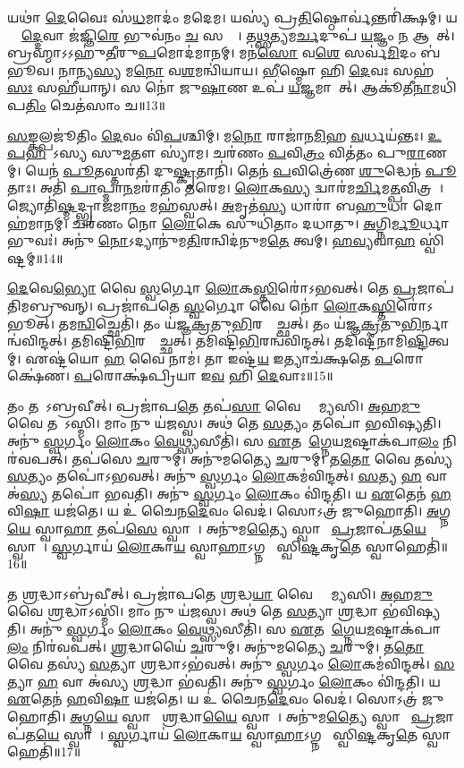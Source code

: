    𑌯𑌥𑌾॑ \ul{𑌦𑍇}𑌵𑍈𑌃 𑌸॑\ul{𑌧}𑌮𑌾𑌦𑌂॑ 𑌮𑌦𑍇𑌮।
   𑌯𑌸𑍍𑌯॑ 𑌪𑍍𑌰\ul{𑌤𑌿}𑌷𑍍𑌠𑍋𑌰𑍍𑌵॑𑌨𑍍𑌤𑌰𑌿॑𑌕𑍍𑌷𑌮𑍍।
   𑌯𑌸𑍍𑌮𑌾᳚\ul{𑌦𑍍𑌦𑍇}𑌵𑌾 𑌜॑𑌜𑍍𑌞𑌿\ul{𑌰𑍇} 𑌭𑍁𑌵॑𑌨𑌂 \ul{𑌚} 𑌸𑌰𑍍𑌵𑍇᳚।
   𑌤\ul{𑌥𑍍𑌸}𑌤𑍍𑌯𑌮\ul{𑌰𑍍𑌚}𑌦𑍁𑌪॑ \ul{𑌯}𑌜𑍍𑌞𑌂 \ul{𑌨} 𑌆𑌗𑌾᳚𑌤𑍍।
   𑌬𑍍𑌰𑌹𑍍𑌮𑌾𑌽𑌽𑌹𑍁॑\ul{𑌤𑍀}𑌰𑍁\ul{𑌪}𑌮𑍋𑌦॑𑌮𑌾𑌨𑌮𑍍।
   𑌮𑌨॑\ul{𑌸𑍋} 𑌵\ul{𑌶𑍇} 𑌸𑌰𑍍𑌵॑\ul{𑌮𑌿}𑌦𑌂 𑌬॑𑌭𑍂𑌵।
   𑌨𑌾𑌨𑍍𑌯\ul{𑌸𑍍𑌯} 𑌮\ul{𑌨𑍋} 𑌵\ul{𑌶}𑌮𑌨𑍍𑌵𑌿॑𑌯𑌾𑌯।
   \ul{𑌭𑍀}𑌷𑍍𑌮𑍋 𑌹𑌿 \ul{𑌦𑍇}𑌵𑌃 𑌸𑌹॑\ul{𑌸𑌃} 𑌸𑌹𑍀॑𑌯𑌾𑌨𑍍।
   𑌸 𑌨𑍋॑ 𑌜𑍁\ul{𑌷𑌾}𑌣 𑌉𑌪॑ \ul{𑌯}𑌜𑍍𑌞𑌮𑌾𑌗𑌾᳚𑌤𑍍।
   𑌆𑌕𑍂॑𑌤𑍀\ul{𑌨𑌾}𑌮𑌧𑌿॑𑌪\ul{𑌤𑌿𑌂} 𑌚𑍇𑌤॑𑌸𑌾𑌂 𑌚॥13॥

   \ul{𑌸}\ul{𑌙𑍍𑌕}𑌲𑍍𑌪𑌜𑍂॑𑌤𑌿𑌂 \ul{𑌦𑍇}𑌵𑌂 𑌵𑌿॑\ul{𑌪}𑌶𑍍𑌚𑌿𑌮𑍍।
   𑌮\ul{𑌨𑍋} 𑌰𑌾𑌜𑌾॑𑌨\ul{𑌮𑌿}𑌹 \ul{𑌵}𑌰𑍍𑌧𑌯॑𑌨𑍍𑌤𑌃।
   \ul{𑌉}\ul{𑌪}\ul{𑌹}𑌵𑍇᳚𑌽𑌸𑍍𑌯 𑌸𑍁\ul{𑌮}𑌤𑍗 𑌸𑍍𑌯𑌾॑𑌮।
   𑌚𑌰॑𑌣𑌂 \ul{𑌪}𑌵𑌿\ul{𑌤𑍍𑌰𑌂} 𑌵𑌿𑌤॑𑌤𑌂 𑌪𑍁\ul{𑌰𑌾}𑌣𑌮𑍍।
   𑌯𑍇𑌨॑ \ul{𑌪𑍂}𑌤𑌸𑍍𑌤𑌰॑𑌤𑌿 𑌦𑍁\ul{𑌷𑍍𑌕𑍃}𑌤𑌾𑌨𑌿॑।
   𑌤𑍇𑌨॑ \ul{𑌪}𑌵𑌿𑌤𑍍𑌰𑍇॑𑌣 \ul{𑌶𑍁}𑌦𑍍𑌧𑍇𑌨॑ \ul{𑌪𑍂}𑌤𑌾𑌃।
   𑌅𑌤𑌿॑ \ul{𑌪𑌾}𑌪𑍍𑌮𑌾\ul{𑌨}𑌮𑌰𑌾॑𑌤𑌿𑌂 𑌤𑌰𑍇𑌮।
   \ul{𑌲𑍋}𑌕\ul{𑌸𑍍𑌯} 𑌦𑍍𑌵𑌾𑌰॑𑌮\ul{𑌰𑍍𑌚𑌿}𑌮\ul{𑌤𑍍𑌪}𑌵𑌿𑌤𑍍𑌰𑌮𑍍᳚।
   𑌜𑍍𑌯𑍋𑌤𑌿॑\ul{𑌷𑍍𑌮}𑌦𑍍𑌭𑍍𑌰𑌾𑌜॑𑌮𑌾\ul{𑌨𑌂} 𑌮𑌹॑𑌸𑍍𑌵𑌤𑍍।
   \ul{𑌅}𑌮𑍃𑌤॑\ul{𑌸𑍍𑌯} 𑌧𑌾𑌰𑌾॑ 𑌬\ul{𑌹𑍁}𑌧𑌾 𑌦𑍋𑌹॑𑌮𑌾𑌨𑌮𑍍।
   𑌚𑌰॑𑌣𑌂 𑌨𑍋 \ul{𑌲𑍋}𑌕𑍇 𑌸𑍁𑌧𑌿॑𑌤𑌾𑌂 𑌦𑌧𑌾𑌤𑍁।
   \ul{𑌅}𑌗𑍍𑌨𑌿\ul{𑌰𑍍𑌮𑍂}𑌰𑍍𑌧𑌾 𑌭𑍁𑌵𑌃॑।
   𑌅𑌨𑍁॑ \ul{𑌨𑍋}𑌽𑌦𑍍𑌯𑌾𑌨𑍁॑𑌮\ul{𑌤𑌿}𑌰𑌨𑍍𑌵𑌿𑌦॑𑌨𑍁𑌮\ul{𑌤𑍇} 𑌤𑍍𑌵𑌮𑍍।
   \ul{𑌹}\ul{𑌵𑍍𑌯}𑌵𑌾\ul{𑌹}\ul{} 𑌸𑍍𑌵𑌿॑𑌷𑍍𑌟𑌮𑍍॥14॥\anuvakamend
  
   \ul{𑌦𑍇}𑌵𑍇\ul{𑌭𑍍𑌯𑍋} 𑌵𑍈 \ul{𑌸𑍍𑌵}𑌰𑍍𑌗𑍋 \ul{𑌲𑍋}𑌕\ul{𑌸𑍍𑌤𑌿}𑌰𑍋॑𑌽𑌭𑌵𑌤𑍍।
   𑌤𑍇 \ul{𑌪𑍍𑌰}𑌜𑌾𑌪॑𑌤𑌿𑌮𑌬𑍍𑌰𑍁𑌵𑌨𑍍।
   𑌪𑍍𑌰𑌜𑌾॑𑌪𑌤𑍇 \ul{𑌸𑍍𑌵}𑌰𑍍𑌗𑍋 𑌵𑍈 𑌨𑍋॑ \ul{𑌲𑍋}𑌕\ul{𑌸𑍍𑌤𑌿}𑌰𑍋॑𑌽𑌭𑍂𑌤𑍍।
   𑌤𑌮\ul{𑌨𑍍𑌵𑌿}𑌚𑍍𑌛𑍇𑌤𑌿॑।
   𑌤𑌂 𑌯॑𑌜𑍍𑌞\ul{𑌕𑍍𑌰}𑌤𑍁\ul{𑌭𑌿}𑌰𑌨𑍍𑌵𑍈᳚𑌚𑍍𑌛𑌤𑍍।
   𑌤𑌂 𑌯॑𑌜𑍍𑌞\ul{𑌕𑍍𑌰}𑌤𑍁\ul{𑌭𑌿}𑌰𑍍𑌨𑌾𑌨𑍍𑌵॑𑌵𑌿𑌨𑍍𑌦𑌤𑍍।
   𑌤𑌮𑌿𑌷𑍍𑌟𑌿\ul{𑌭𑌿}\-𑌰𑌨𑍍𑌵𑍈᳚𑌚𑍍𑌛𑌤𑍍।
   𑌤𑌮𑌿𑌷𑍍𑌟𑌿॑\ul{𑌭𑌿}𑌰𑌨𑍍𑌵॑𑌵𑌿𑌨𑍍𑌦𑌤𑍍।
   𑌤𑌦𑌿𑌷𑍍𑌟𑍀॑𑌨𑌾𑌮𑌿\ul{𑌷𑍍𑌟𑌿}𑌤𑍍𑌵𑌮𑍍।
   𑌏𑌷𑍍𑌟॑𑌯𑍋 \ul{𑌹} 𑌵𑍈 𑌨𑌾𑌮॑।
   𑌤𑌾 𑌇𑌷𑍍𑌟॑\ul{𑌯} 𑌇𑌤𑍍𑌯𑌾𑌚॑𑌕𑍍𑌷𑌤𑍇 \ul{𑌪}𑌰𑍋𑌕𑍍𑌷𑍇॑𑌣।
   \ul{𑌪}𑌰𑍋𑌕𑍍𑌷॑𑌪𑍍𑌰𑌿𑌯𑌾 𑌇\ul{𑌵} 𑌹𑌿 \ul{𑌦𑍇}𑌵𑌾𑌃॥15॥

   𑌤𑌂 𑌤𑌪𑍋᳚𑌽𑌬𑍍𑌰𑌵𑍀𑌤𑍍।
   𑌪𑍍𑌰𑌜𑌾॑𑌪\ul{𑌤𑍇} 𑌤𑌪॑\ul{𑌸𑌾} 𑌵𑍈 𑌶𑍍𑌰𑌾᳚𑌮𑍍𑌯𑌸𑌿।
   \ul{𑌅}𑌹\ul{𑌮𑍁} 𑌵𑍈 𑌤𑌪𑍋᳚𑌽𑌸𑍍𑌮𑌿।
   𑌮𑌾𑌂 𑌨𑍁 𑌯॑𑌜𑌸𑍍𑌵।
   𑌅𑌥॑ 𑌤𑍇 \ul{𑌸}𑌤𑍍𑌯𑌂 𑌤𑌪𑍋॑ 𑌭𑌵𑌿𑌷𑍍𑌯𑌤𑌿।
   𑌅𑌨𑍁॑ \ul{𑌸𑍍𑌵}𑌰𑍍𑌗𑌂 \ul{𑌲𑍋}𑌕𑌂 \ul{𑌵𑍇}𑌥𑍍𑌸𑍍𑌯𑌸𑍀𑌤𑌿॑।
   𑌸 \ul{𑌏}𑌤𑌮𑌾᳚\ul{𑌗𑍍𑌨𑍇}𑌯\ul{𑌮}𑌷𑍍𑌟𑌾𑌕॑𑌪𑌾\ul{𑌲𑌂} 𑌨𑌿𑌰॑𑌵𑌪𑌤𑍍।
   𑌤𑌪॑𑌸𑍇 \ul{𑌚}𑌰𑍁𑌮𑍍।
   𑌅𑌨𑍁॑𑌮𑌤𑍍𑌯𑍈 \ul{𑌚}𑌰𑍁𑌮𑍍।
   𑌤\ul{𑌤𑍋} 𑌵𑍈 𑌤𑌸𑍍𑌯॑ \ul{𑌸}𑌤𑍍𑌯𑌂 𑌤𑌪𑍋॑𑌽𑌭𑌵𑌤𑍍।
   𑌅𑌨𑍁॑ \ul{𑌸𑍍𑌵}𑌰𑍍𑌗𑌂 \ul{𑌲𑍋}𑌕𑌮॑𑌵𑌿𑌨𑍍𑌦𑌤𑍍।
   \ul{𑌸}𑌤𑍍𑌯 \ul{𑌹} 𑌵𑌾 𑌅॑\ul{𑌸𑍍𑌯} 𑌤𑌪𑍋॑ 𑌭𑌵𑌤𑌿।
   𑌅𑌨𑍁॑ \ul{𑌸𑍍𑌵}𑌰𑍍𑌗𑌂 \ul{𑌲𑍋}𑌕𑌂 𑌵𑌿॑𑌨𑍍𑌦𑌤𑌿।
   𑌯 \ul{𑌏}𑌤𑍇𑌨॑ \ul{𑌹}𑌵𑌿\ul{𑌷𑌾} 𑌯𑌜॑𑌤𑍇।
   𑌯 𑌉॑ 𑌚𑍈𑌨\ul{𑌦𑍇}𑌵𑌂 𑌵𑍇𑌦॑।
   𑌸𑍋𑌽𑌤𑍍𑌰॑ 𑌜𑍁𑌹𑍋𑌤𑌿।
   \ul{𑌅}𑌗𑍍𑌨\ul{𑌯𑍇} 𑌸𑍍𑌵𑌾\ul{𑌹𑌾} 𑌤𑌪॑\ul{𑌸𑍇} 𑌸𑍍𑌵𑌾𑌹𑌾᳚।
   𑌅𑌨𑍁॑𑌮\ul{𑌤𑍍𑌯𑍈} 𑌸𑍍𑌵𑌾𑌹𑌾᳚ \ul{𑌪𑍍𑌰}𑌜𑌾𑌪॑𑌤\ul{𑌯𑍇} 𑌸𑍍𑌵𑌾𑌹𑌾᳚।
   \ul{𑌸𑍍𑌵}𑌰𑍍𑌗𑌾𑌯॑ \ul{𑌲𑍋}𑌕𑌾\ul{𑌯} 𑌸𑍍𑌵𑌾\ul{𑌹𑌾}𑌽𑌗𑍍𑌨𑌯𑍇᳚ 𑌸𑍍𑌵𑌿\ul{𑌷𑍍𑌟}𑌕𑍃\ul{𑌤𑍇} 𑌸𑍍𑌵𑌾𑌹𑍇𑌤𑌿॑॥16॥

   𑌤 \ul{𑌶𑍍𑌰}𑌦𑍍𑌧𑌾𑌽𑌬𑍍𑌰॑𑌵𑍀𑌤𑍍।
   𑌪𑍍𑌰𑌜𑌾॑𑌪𑌤𑍇 \ul{𑌶𑍍𑌰}𑌦𑍍𑌧\ul{𑌯𑌾} 𑌵𑍈 𑌶𑍍𑌰𑌾᳚𑌮𑍍𑌯𑌸𑌿।
   \ul{𑌅}𑌹\ul{𑌮𑍁} 𑌵𑍈 \ul{𑌶𑍍𑌰}𑌦𑍍𑌧𑌾𑌽𑌸𑍍𑌮𑌿॑।
   𑌮𑌾𑌂 𑌨𑍁 𑌯॑𑌜𑌸𑍍𑌵।
   𑌅𑌥॑ 𑌤𑍇 \ul{𑌸}𑌤𑍍𑌯𑌾 \ul{𑌶𑍍𑌰}𑌦𑍍𑌧𑌾 𑌭॑𑌵𑌿𑌷𑍍𑌯𑌤𑌿।
   𑌅𑌨𑍁॑ \ul{𑌸𑍍𑌵}𑌰𑍍𑌗𑌂 \ul{𑌲𑍋}𑌕𑌂 \ul{𑌵𑍇}𑌥𑍍𑌸𑍍𑌯𑌸𑍀𑌤𑌿॑।
   𑌸 \ul{𑌏}𑌤𑌮𑌾᳚\ul{𑌗𑍍𑌨𑍇}𑌯\ul{𑌮}𑌷𑍍𑌟𑌾𑌕॑𑌪𑌾\ul{𑌲𑌂} 𑌨𑌿𑌰॑𑌵𑌪𑌤𑍍।
   \ul{𑌶𑍍𑌰}𑌦𑍍𑌧𑌾𑌯𑍈॑ \ul{𑌚}𑌰𑍁𑌮𑍍।
   𑌅𑌨𑍁॑𑌮𑌤𑍍𑌯𑍈 \ul{𑌚}𑌰𑍁𑌮𑍍।
   𑌤\ul{𑌤𑍋} 𑌵𑍈 𑌤𑌸𑍍𑌯॑ \ul{𑌸}𑌤𑍍𑌯𑌾 \ul{𑌶𑍍𑌰}𑌦𑍍𑌧𑌾𑌽𑌭॑𑌵𑌤𑍍।
   𑌅𑌨𑍁॑ \ul{𑌸𑍍𑌵}𑌰𑍍𑌗𑌂 \ul{𑌲𑍋}𑌕𑌮॑𑌵𑌿𑌨𑍍𑌦𑌤𑍍।
   \ul{𑌸}𑌤𑍍𑌯𑌾 \ul{𑌹} 𑌵𑌾 𑌅॑𑌸𑍍𑌯 \ul{𑌶𑍍𑌰}𑌦𑍍𑌧𑌾 𑌭॑𑌵𑌤𑌿।
   𑌅𑌨𑍁॑ \ul{𑌸𑍍𑌵}𑌰𑍍𑌗𑌂 \ul{𑌲𑍋}𑌕𑌂 𑌵𑌿॑𑌨𑍍𑌦𑌤𑌿।
   𑌯 \ul{𑌏}𑌤𑍇𑌨॑ \ul{𑌹}𑌵𑌿\ul{𑌷𑌾} 𑌯𑌜॑𑌤𑍇।
   𑌯 𑌉॑ 𑌚𑍈𑌨\ul{𑌦𑍇}𑌵𑌂 𑌵𑍇𑌦॑।
   𑌸𑍋𑌽𑌤𑍍𑌰॑ 𑌜𑍁𑌹𑍋𑌤𑌿।
   \ul{𑌅}𑌗𑍍𑌨\ul{𑌯𑍇} 𑌸𑍍𑌵𑌾𑌹𑌾᳚ \ul{𑌶𑍍𑌰}𑌦𑍍𑌧𑌾\ul{𑌯𑍈} 𑌸𑍍𑌵𑌾𑌹𑌾᳚।
   𑌅𑌨𑍁॑𑌮\ul{𑌤𑍍𑌯𑍈} 𑌸𑍍𑌵𑌾𑌹𑌾᳚ \ul{𑌪𑍍𑌰}𑌜𑌾𑌪॑𑌤\ul{𑌯𑍇} 𑌸𑍍𑌵𑌾𑌹𑌾᳚।
   \ul{𑌸𑍍𑌵}𑌰𑍍𑌗𑌾𑌯॑ \ul{𑌲𑍋}𑌕𑌾\ul{𑌯} 𑌸𑍍𑌵𑌾\ul{𑌹𑌾}𑌽𑌗𑍍𑌨𑌯𑍇᳚ 𑌸𑍍𑌵𑌿\ul{𑌷𑍍𑌟}𑌕𑍃\ul{𑌤𑍇} 𑌸𑍍𑌵𑌾𑌹𑍇𑌤𑌿॑॥17॥

